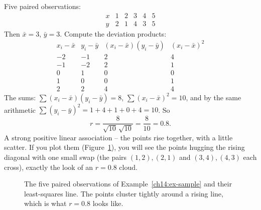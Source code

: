 \begin{example}
\label{ch14:ex-sample}
Five paired observations:
\[
\begin{array}{c|ccccc}
x & 1 & 2 & 3 & 4 & 5 \\ \hline
y & 2 & 1 & 4 & 3 & 5
\end{array}
\]
Then $\bar x = 3$, $\bar y = 3$. Compute the deviation products:
\[
\begin{array}{c|c|c|c}
x_i - \bar x & y_i - \bar y & (x_i-\bar x)(y_i-\bar y) & (x_i-\bar x)^2 \\ \hline
-2 & -1 & 2 & 4 \\
-1 & -2 & 2 & 1 \\
 0 &  1 & 0 & 0 \\
 1 &  0 & 0 & 1 \\
 2 &  2 & 4 & 4
\end{array}
\]
The sums: $\sum (x_i-\bar x)(y_i-\bar y) = 8$, $\sum(x_i-\bar x)^2 = 10$, and by the
same arithmetic $\sum (y_i - \bar y)^2 = 1 + 4 + 1 + 0 + 4 = 10$. So
\[
r = \frac{8}{\sqrt{10}\,\sqrt{10}} = \frac{8}{10} = 0.8.
\]
A strong positive linear association -- the points rise together, with a little
scatter. If you plot them (Figure~\ref{ch14:fig-sample}), you will see the points
hugging the rising diagonal with one small swap (the pairs $(1,2),(2,1)$ and
$(3,4),(4,3)$ each cross), exactly the look of an $r = 0.8$ cloud.
\end{example}

\begin{figure}[H]
\centering
{}
\caption{The five paired observations of Example~\ref{ch14:ex-sample} and their
least-squares line. The points cluster tightly around a rising line, which is what
$r = 0.8$ looks like.}
\label{ch14:fig-sample}
\end{figure}

